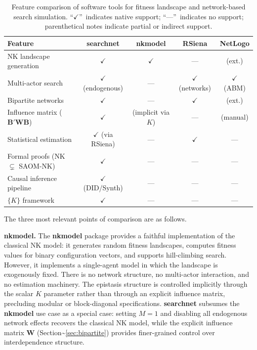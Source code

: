 \documentclass[
]{article}
\begin{document}
\begin{table}[t]
\centering
\caption{Feature comparison of software tools for fitness landscape and
network-based search simulation.  ``$\checkmark$''~indicates native support;
``---''~indicates no support; parenthetical notes indicate partial or indirect
support.}
\label{tab:feature-comparison}
\begin{tabular}{lcccc}
\toprule
Feature & \textbf{searchnet} & \textbf{nkmodel} & \textbf{RSiena} & NetLogo \\
\midrule
NK landscape generation           & $\checkmark$              & $\checkmark$  & ---           & (ext.)    \\
Multi-actor search                & $\checkmark$ (endogenous) & ---           & $\checkmark$ (networks) & $\checkmark$ (ABM) \\
Bipartite networks                & $\checkmark$              & ---           & $\checkmark$  & (ext.)    \\
Influence matrix ($\mathbf{B}'\mathbf{W}\mathbf{B}$) & $\checkmark$ & (implicit via $K$) & --- & (manual) \\
Statistical estimation            & $\checkmark$ (via RSiena) & ---           & $\checkmark$  & ---       \\
Formal proofs (NK $\subsetneq$ SAOM-NK) & $\checkmark$              & ---           & ---           & ---       \\
Causal inference pipeline         & $\checkmark$ (DID/Synth)  & ---           & ---           & ---       \\
$\{K\}$ framework                    & $\checkmark$              & ---           & ---           & ---       \\
\bottomrule
\end{tabular}
\end{table}

The three most relevant points of comparison are as follows.

\textbf{\textbf{nkmodel}.} The \textbf{nkmodel} package
\citep{Baumann2019nk} provides a faithful implementation of the
classical NK model: it generates random fitness landscapes, computes
fitness values for binary configuration vectors, and supports
hill-climbing search. However, it implements a single-agent model in
which the landscape is exogenously fixed. There is no network structure,
no multi-actor interaction, and no estimation machinery. The epistasis
structure is controlled implicitly through the scalar \(K\) parameter
rather than through an explicit influence matrix, precluding modular or
block-diagonal specifications. \textbf{searchnet} subsumes the
\textbf{nkmodel} use case as a special case: setting \(M = 1\) and
disabling all endogenous network effects recovers the classical NK
model, while the explicit influence matrix \(\mathbf{W}\)
(Section\textasciitilde{}\ref{sec:bipartite}) provides finer-grained
control over interdependence structure.
\end{document}
